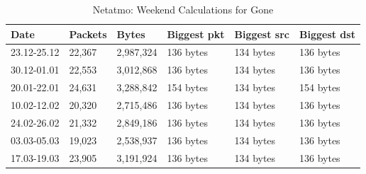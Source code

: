 \begin{table}[H]
    \caption{Netatmo: Weekend Calculations for Gone}
    \begin{tabular}{|l|l|l|l|l|l|}
    \hline
        \textbf{Date}        & \textbf{Packets} & \textbf{Bytes} & \textbf{Biggest pkt} & \textbf{Biggest src} & \textbf{Biggest dst} \\ \hline
        23.12-25.12 & 22,367                 & 2,987,324              & 136 bytes          & 134 bytes               & 136 bytes                                \\ \hline
        30.12-01.01 & 22,553                 & 3,012,868              & 136 bytes          & 134 bytes               & 136 bytes                                \\ \hline
        20.01-22.01 & 24,631                 & 3,288,842              & 154 bytes          & 134 bytes               & 154 bytes                                \\ \hline
        10.02-12.02 & 20,320                 & 2,715,486              & 136 bytes          & 134 bytes               & 136 bytes                                \\ \hline
        24.02-26.02 & 21,332                 & 2,849,186              & 136 bytes          & 134 bytes               & 136 bytes                                \\ \hline
        03.03-05.03 & 19,023                 & 2,538,937              & 136 bytes          & 134 bytes               & 136 bytes                                \\ \hline
        17.03-19.03 & 23,905                 & 3,191,924              & 136 bytes          & 134 bytes               & 136 bytes                                \\ \hline
    \end{tabular}
    \label{tab:NetatmoGoneWeekends}
\end{table}

